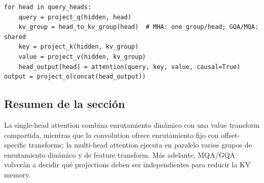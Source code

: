 \begin{lstlisting}[caption={Estructura conceptual de la multi-head attention y de la KV compartida}]
for head in query_heads:
    query = project_q(hidden, head)
    kv_group = head_to_kv_group(head)  # MHA: one group/head; GQA/MQA: shared
    key = project_k(hidden, kv_group)
    value = project_v(hidden, kv_group)
    head_output[head] = attention(query, key, value, causal=True)
output = project_o(concat(head_output))
\end{lstlisting}


\subsection{Resumen de la sección}

La single-head attention combina enrutamiento dinámico con una value transform compartida, mientras que la convolution ofrece enrutamiento fijo con offset-specific transforms; la multi-head attention ejecuta en paralelo varios grupos de enrutamiento dinámico y de feature transform. Más adelante, MQA/GQA volverán a decidir qué projections deben ser independientes para reducir la KV memory.

